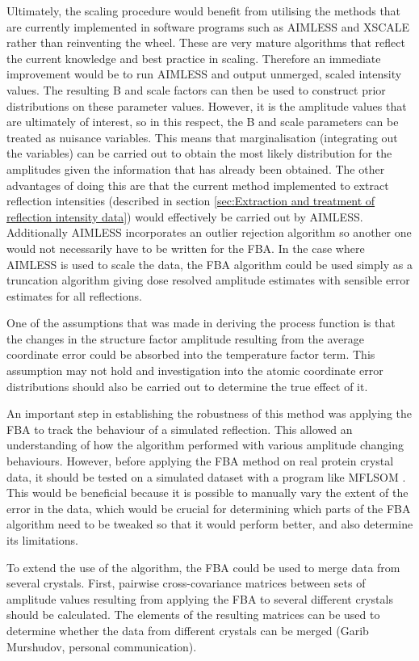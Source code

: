 Ultimately, the scaling procedure would benefit from utilising the methods that are currently implemented in software programs such as AIMLESS and XSCALE rather than reinventing the wheel.
These are very mature algorithms that reflect the current knowledge and best practice in scaling.
Therefore an immediate improvement would be to run AIMLESS and output unmerged, scaled intensity values.
The resulting B and scale factors can then be used to construct prior distributions on these parameter values.
However, it is the amplitude values that are ultimately of interest, so in this respect, the B and scale parameters can be treated as nuisance variables.
This means that marginalisation (integrating out the variables) can be carried out to obtain the most likely distribution for the amplitudes given the information that has already been obtained.
The other advantages of doing this are that the current method implemented to extract reflection intensities (described in section \ref{sec:Extraction and treatment of reflection intensity data}) would effectively be carried out by AIMLESS.
Additionally AIMLESS incorporates an outlier rejection algorithm so another one would not necessarily have to be written for the FBA.
In the case where AIMLESS is used to scale the data, the FBA algorithm could be used simply as a truncation algorithm giving dose resolved amplitude estimates with sensible error estimates for all reflections.

One of the assumptions that was made in deriving the process function is that the changes in the structure factor amplitude resulting from the average coordinate error could be absorbed into the temperature factor term.
This assumption may not hold and investigation into the atomic coordinate error distributions should also be carried out to determine the true effect of it.

An important step in establishing the robustness of this method was applying the FBA to track the behaviour of a simulated reflection.
This allowed an understanding of how the algorithm performed with various amplitude changing behaviours.
However, before applying the FBA method on real protein crystal data, it should be tested on a simulated dataset with a program like MFLSOM \cite{holton2014r}.
This would be beneficial because it is possible to manually vary the extent of the error in the data, which would be crucial for determining which parts of the FBA algorithm need to be tweaked so that it would perform better, and also determine its limitations.

To extend the use of the algorithm, the FBA could be used to merge data from several crystals.
First, pairwise cross-covariance matrices between sets of amplitude values resulting from applying the FBA to several different crystals should be calculated.
The elements of the resulting matrices can be used to determine whether the data from different crystals can be merged (Garib Murshudov, personal communication).

